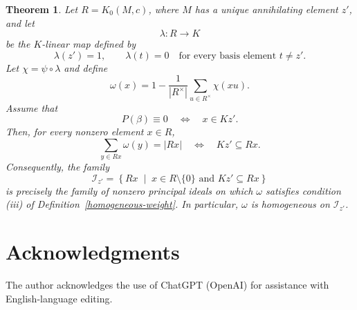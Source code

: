 \documentclass[11pt,reqno]{amsart}
\theoremstyle{plain}
\newtheorem{thm}{Theorem}[section]
\theoremstyle{remark}
\theoremstyle{definition}
\begin{document}
\begin{thm}\label{HomogeneousOnAdmissibleIdeals}
Let \(R=K_0(M,c)\), where \(M\) has a unique annihilating element \(z'\), and let
\[
\lambda:R\longrightarrow K
\]
be the \(K\)-linear map defined by
\[
\lambda(z')=1,
\qquad
\lambda(t)=0
\quad\text{for every basis element }t\neq z'.
\]
Let
\(\chi=\psi\circ\lambda\)
and define
\[
\omega(x)
=
1-\frac{1}{|R^\times|}
\sum_{u\in R^\times}\!\chi(xu).
\]
Assume that
\[
P(\beta)\equiv0
\quad\Longleftrightarrow\quad
x\in Kz'.
\]
Then, for every nonzero element \(x\in R\),
\[
\sum_{y\in Rx}\!\omega(y)=|Rx|
\quad\Longleftrightarrow\quad
Kz'\subseteq Rx.
\]
Consequently, the family
\[
\mathcal{I}_{z'}
=
\left\{
Rx\;\middle|\;
x\in R\setminus\{0\}
\text{ and }
Kz'\subseteq Rx
\right\}
\]
is precisely the family of nonzero principal ideals on which \(\omega\)
satisfies condition {\rm(iii)} of
Definition~\ref{homogeneous-weight}. In particular, \(\omega\) is homogeneous
on \(\mathcal{I}_{z'}\).
\end{thm}



\section*{Acknowledgments}
The author acknowledges the use of ChatGPT (OpenAI) for assistance with English-language editing.

%




\end{document}
